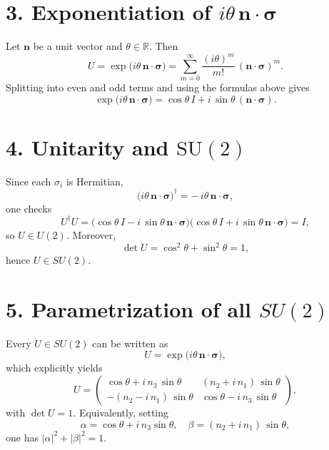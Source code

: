 \documentclass[a4paper,12pt]{report}
\begin{document}
{\section*{3. Exponentiation of $i\theta\,\bm n\cdot\bm\sigma$}

Let $\bm n$ be a unit vector and $\theta\in\mathbb R$. Then
\begin{equation}
U = \exp\bigl(i\theta\,\bm n\cdot\bm\sigma\bigr)
= \sum_{m=0}^\infty \frac{(i\theta)^m}{m!}\,(\bm n\cdot\bm\sigma)^m.
\end{equation}
Splitting into even and odd terms and using the formulas above gives
\begin{equation}
\exp\bigl(i\theta\,\bm n\cdot\bm\sigma\bigr)
= \cos\theta\,I
+ i\,\sin\theta\,(\bm n\cdot\bm\sigma).
\end{equation}

\section*{4. Unitarity and $\mathrm{SU}(2)$}

Since each $\sigma_i$ is Hermitian,
\begin{equation}
\bigl(i\theta\,\bm n\cdot\bm\sigma\bigr)^\dagger = -\,i\theta\,\bm n\cdot\bm\sigma,
\end{equation}
one checks
\begin{equation}
U^\dagger U
= \bigl(\cos\theta\,I - i\,\sin\theta\,\bm n\cdot\bm\sigma\bigr)
  \bigl(\cos\theta\,I + i\,\sin\theta\,\bm n\cdot\bm\sigma\bigr)
= I,
\end{equation}
so $U\in U(2)$. Moreover,
\begin{equation}
\det U = \cos^2\theta + \sin^2\theta = 1,
\end{equation}
hence $U\in SU(2)$.

\section*{5. Parametrization of all $SU(2)$}

Every $U\in SU(2)$ can be written as
\begin{equation}
U = \exp\bigl(i\theta\,\bm n\cdot\bm\sigma\bigr),
\end{equation}
which explicitly yields
\begin{equation}
U =
\begin{pmatrix}
\cos\theta + i\,n_3\,\sin\theta & (n_2 + i\,n_1)\,\sin\theta \\[6pt]
-(n_2 - i\,n_1)\,\sin\theta      & \cos\theta - i\,n_3\,\sin\theta
\end{pmatrix},
\end{equation}
with $\det U=1$. Equivalently, setting
\begin{equation}
\alpha = \cos\theta + i\,n_3\sin\theta,
\quad
\beta  = (n_2 + i\,n_1)\,\sin\theta,
\end{equation}
one has $|\alpha|^2+|\beta|^2=1$.
} 
\end{document}
